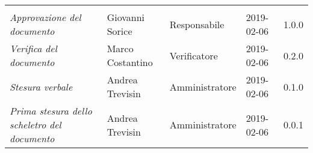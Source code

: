 \newpage 
\section*{}
\begin{table}[H]
	\centering
	\begin{tabular}{p{4cm}|C{3cm}|C{3cm}|R{2.5cm}|R{2cm}}
		
		 & & & & \\
		
		
		\emph{Approvazione del documento} & Giovanni Sorice & Responsabile & 2019-02-06 & 1.0.0 \\
		\hline
		
		\emph{Verifica del documento} & Marco Costantino & Verificatore & 2019-02-06 & 0.2.0 \\
		\hline

		\emph{Stesura verbale} & Andrea Trevisin & Amministratore & 2019-02-06 & 0.1.0 \\
		\hline
		
		\emph{Prima stesura dello scheletro del documento} & Andrea Trevisin & Amministratore & 2019-02-06 & 0.0.1 \\
		
	\end{tabular}
	
\end{table}


\clearpage